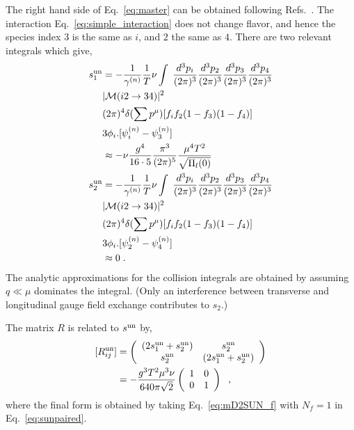 \documentclass[10pt, aps, prd, superscriptaddress, nofootinbib, 
               amsmath, amssymb, twocolumn,
               preprintnumbers, showpacs,
               raggedbottom,
               floatfix]{revtex4-1}
\newcommand{\dthree}[1]{\frac{d^3#1}{(2\pi)^3}}
\newcommand{\deltafour}{(2\pi)^4\delta(\sum p^\mu)}
\newcommand{\calM}{{\cal{M}}}
\newcommand{\un}{{\rm{un}}}
\begin{document}
The right hand side of Eq.~\ref{eq:master} can be obtained following 
Refs.~\cite{Heiselberg:1993,Alford:2014doa}. The interaction Eq.~\ref{eq:simple_interaction} does not
change flavor, and hence the species index $3$ is the same as $i$, and $2$ the
same as $4$. There are two relevant integrals which give, 
\begin{equation}
\begin{split}
s_1^\un&=
 -\frac{1}{\gamma^{(n)}}\frac{1}{T}\nu \int\;
 \dthree{p_i}\dthree{p_2}\dthree{p_3}\dthree{p_4}\\
 &
 |\calM(i2\rightarrow34)|^2\\
 &
 \deltafour
 [f_if_2(1-f_3)(1-f_4)]\\
 &3\phi_i.[\psi_i^{(n)}-\psi_3^{(n)}]\\
&\approx-\nu\frac{g^4}{16\cdot 5}
\frac{\pi^3}{(2\pi)^5}
\frac{\mu^4T^2}{\sqrt{\Pi_l(0)}}\\
s_2^\un
 &=-\frac{1}{\gamma^{(n)}}\frac{1}{T}\nu \int\;
 \dthree{p_i}\dthree{p_2}\dthree{p_3}\dthree{p_4}\\
 &
 |\calM(i2\rightarrow34)|^2\\
 &
 \deltafour
 [f_if_2(1-f_3)(1-f_4)]\\
 &3\phi_i.[\psi_2^{(n)}-\psi_4^{(n)}]\\
&\approx 0\;.~\label{eq:sunpaired}
\end{split}
\end{equation}
The analytic approximations for the collision integrals are obtained by assuming
$q\ll\mu$ dominates the integral. (Only an interference between transverse and longitudinal gauge field 
exchange contributes to $s_2$.)
  
The matrix $R$ is related to $s^\un$ by,
\begin{equation}
\begin{split}
[R^\un_{ij}]&=
\left(\begin{array}{cc}
(2s^\un_1+s^\un_2)&s^\un_2\\
s^\un_2&(2s^\un_1+s^\un_2)
\end{array}\right)\\
&=-\frac{g^3T^2\mu^3\nu}{640\pi \sqrt{2}}
\left(\begin{array}{cc}
1&0\\
0&1
\end{array}\right)
~\label{eq:RijunpairedDv2}\;,
\end{split}
\end{equation}
where the final form is obtained by taking
Eq.~\ref{eq:mD2SUN_f} with $N_f=1$ in Eq.~\ref{eq:sunpaired}.
\end{document}
